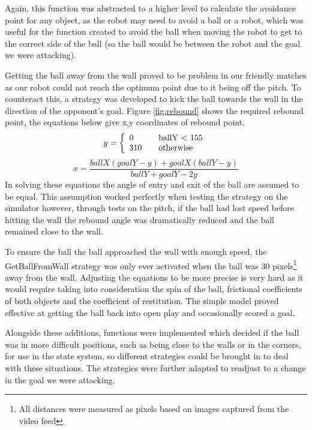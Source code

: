 Again, this function was abstracted to a higher level to calculate the avoidance point for any object, as the robot may need to avoid a ball or a robot, which was useful for the function created to avoid the ball when moving the robot to get to the correct side of the ball (so the ball would be between the robot and the goal we were attacking). \linebreak

Getting the ball away from the wall proved to be problem in our friendly matches as our robot could not reach the optimum point due to it being off the pitch. To counteract this, a strategy was developed to kick the ball towards the wall in the direction of the opponent's goal. Figure \ref{fig:rebound} shows the required rebound point, the equations below give x,y coordinates of rebound point.
\[y = \left\{ 
\begin{array}{l l}
  0 & \quad \mbox{ballY $<$ 155}\\
  310 & \quad \mbox{otherwise}\\ \end{array} \right. \]
\[x = \frac{ballX(goalY-y) + goalX(ballY-y)}{ballY + goalY - 2y} \]
In solving these equations the angle of entry and exit of the ball are assumed to be equal. This assumption worked perfectly when testing the strategy on the simulator however, through tests on the pitch, if the ball had lost speed before hitting the wall the rebound angle was dramatically reduced and the ball remained close to the wall. 

To ensure the ball the ball approached the wall with enough speed, the GetBallFromWall strategy was only ever activated when the ball was 30 pixels\footnote{All distances were measured as pixels based on images captured from the video feed} away from the wall. Adjusting the equations to be more precise is very hard as it would require taking into consideration the spin of the ball, frictional coefficients of both objects and the coefficient of restitution. The simple model proved effective at getting the ball back into open play and occasionally scored a goal.\linebreak

Alongside these additions, functions were implemented which decided if the ball was in more difficult positions, such as being close to the walls or in the corners, for use in the state system, so different strategies could be brought in to deal with these situations. The strategies were further adapted to readjust to a change in the goal we were attacking. 

